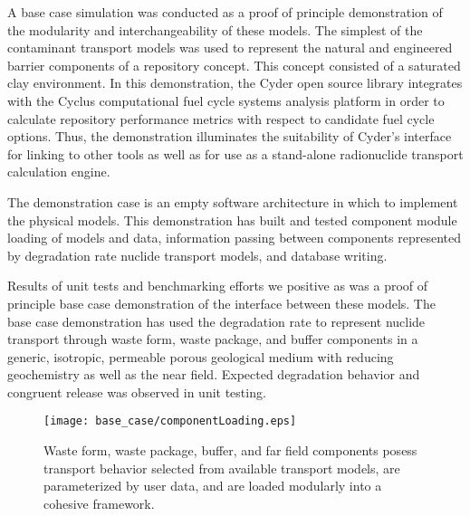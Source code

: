 
A base case simulation was conducted as a proof of principle demonstration of 
the modularity and interchangeability of these models. The simplest of the 
contaminant transport models was used to represent the natural and engineered 
barrier components of a repository concept. This concept consisted of a  
saturated clay environment.  In this demonstration, the Cyder open source 
library integrates with the Cyclus computational fuel cycle systems analysis 
platform in order to calculate repository performance metrics with respect to 
candidate fuel cycle options.  Thus, the demonstration illuminates the 
suitability of Cyder's interface for linking to other tools as well as for use 
as a stand-alone radionuclide transport calculation engine.

The demonstration case is an empty software architecture in which to implement 
the physical models. This demonstration has built and tested component module 
loading of models and data, information passing between components represented by 
degradation rate nuclide transport models, and database writing.

Results of unit tests and benchmarking efforts we positive as was a proof of 
principle base case demonstration of the interface between these models. The 
base case demonstration has used the degradation rate to represent nuclide 
transport through waste form, waste package, and buffer components in a generic, 
isotropic, permeable porous geological medium with reducing geochemistry as well 
as the near field. Expected degradation behavior and congruent release was 
observed in unit testing.  

  \begin{figure}[htbp!]
    \begin{center}
      \texttt{[image: base\_case/componentLoading.eps]}
      \caption{Waste form, waste package, buffer, and far field components 
        posess transport behavior selected from available transport 
        models, are parameterized by user data, and are loaded modularly 
      into a cohesive framework.}
    \end{center}
  \end{figure}

  
